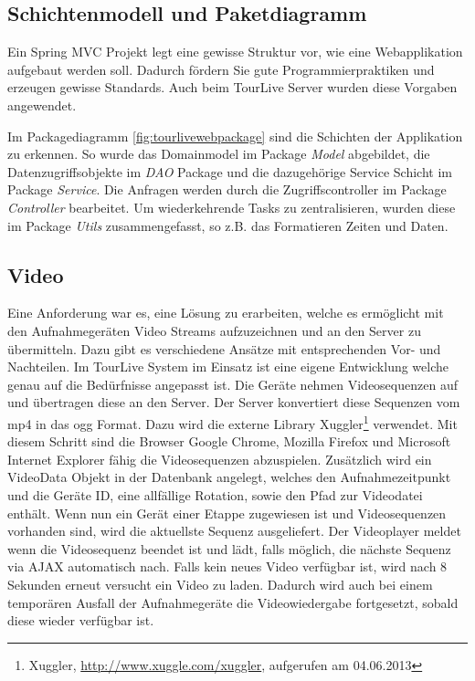 \subsection{Schichtenmodell und Paketdiagramm}
Ein Spring MVC Projekt legt eine gewisse Struktur vor, wie eine Webapplikation aufgebaut werden soll. Dadurch fördern Sie gute Programmierpraktiken und erzeugen gewisse Standards. Auch beim TourLive Server wurden diese Vorgaben angewendet.
\\
\label{fig:tourlivewebpackage}

Im Packagediagramm \ref{fig:tourlivewebpackage} sind die Schichten der Applikation zu erkennen. So wurde das Domainmodel im Package \textit{Model} abgebildet, die Datenzugriffsobjekte im \textit{DAO} Package und die dazugehörige Service Schicht im Package \textit{Service}. Die Anfragen werden durch die Zugriffscontroller im Package \textit{Controller} bearbeitet. Um wiederkehrende Tasks zu zentralisieren, wurden diese im Package \textit{Utils} zusammengefasst, so z.B. das Formatieren Zeiten und Daten.

\subsection{Video}
Eine Anforderung war es, eine Lösung zu erarbeiten, welche es ermöglicht mit den Aufnahmegeräten Video Streams aufzuzeichnen und an den Server zu übermitteln. Dazu gibt es verschiedene Ansätze mit entsprechenden Vor- und Nachteilen. Im TourLive System im Einsatz ist eine eigene Entwicklung welche genau auf die Bedürfnisse angepasst ist. Die Geräte nehmen Videosequenzen auf und übertragen diese an den Server. Der Server konvertiert diese Sequenzen vom mp4 in das ogg Format. Dazu wird die externe Library Xuggler\footnote{Xuggler, \url{http://www.xuggle.com/xuggler}, aufgerufen am 04.06.2013} verwendet. Mit diesem Schritt sind die Browser Google Chrome, Mozilla Firefox und Microsoft Internet Explorer fähig die Videosequenzen abzuspielen. Zusätzlich wird ein VideoData Objekt in der Datenbank angelegt, welches den Aufnahmezeitpunkt und die Geräte ID, eine allfällige Rotation, sowie den Pfad zur Videodatei enthält. Wenn nun ein Gerät einer Etappe zugewiesen ist und Videosequenzen vorhanden sind, wird die aktuellste Sequenz ausgeliefert. Der Videoplayer meldet wenn die Videosequenz beendet ist und lädt, falls möglich, die nächste Sequenz via AJAX automatisch nach. Falls kein neues Video verfügbar ist, wird nach 8 Sekunden erneut versucht ein Video zu laden. Dadurch wird auch bei einem temporären Ausfall der Aufnahmegeräte die Videowiedergabe fortgesetzt, sobald diese wieder verfügbar ist.

